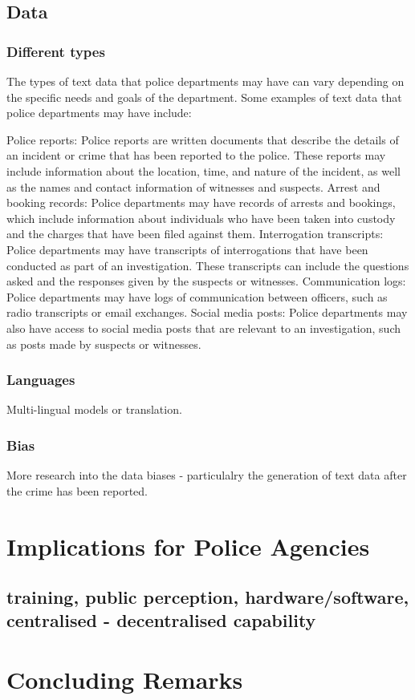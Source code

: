 \subsection{Data}
\subsubsection{Different types} The types of text data that police departments may have can vary depending on the specific needs and goals of the department. Some examples of text data that police departments may have include:

Police reports: Police reports are written documents that describe the details of an incident or crime that has been reported to the police. These reports may include information about the location, time, and nature of the incident, as well as the names and contact information of witnesses and suspects.
Arrest and booking records: Police departments may have records of arrests and bookings, which include information about individuals who have been taken into custody and the charges that have been filed against them.
Interrogation transcripts: Police departments may have transcripts of interrogations that have been conducted as part of an investigation. These transcripts can include the questions asked and the responses given by the suspects or witnesses.
Communication logs: Police departments may have logs of communication between officers, such as radio transcripts or email exchanges.
Social media posts: Police departments may also have access to social media posts that are relevant to an investigation, such as posts made by suspects or witnesses.
\subsubsection{Languages} Multi-lingual models or translation.

\subsubsection{Bias} More research into the data biases - particulalry the generation of text data after the crime has been reported.



\section{Implications for Police Agencies}

\subsection{training, public perception, hardware/software, centralised - decentralised capability}


\section{Concluding Remarks}






